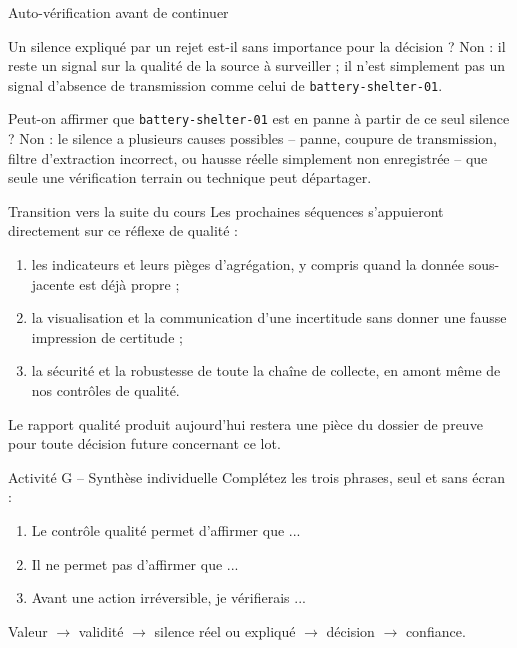 \documentclass[aspectratio=169]{beamer}
\begin{document}
\begin{frame}{Auto-vérification avant de continuer}
  \small
  \begin{block}{Un silence expliqué par un rejet est-il sans importance pour la décision ?}
    Non : il reste un signal sur la qualité de la source à surveiller ; il n'est simplement pas un signal d'absence de transmission comme celui de \texttt{battery-shelter-01}.
  \end{block}
  \begin{block}{Peut-on affirmer que \texttt{battery-shelter-01} est en panne à partir de ce seul silence ?}
    Non : le silence a plusieurs causes possibles -- panne, coupure de transmission, filtre d'extraction incorrect, ou hausse réelle simplement non enregistrée -- que seule une vérification terrain ou technique peut départager.
  \end{block}
\end{frame}

\begin{frame}{Transition vers la suite du cours}
  Les prochaines séquences s'appuieront directement sur ce réflexe de qualité :
  \begin{enumerate}
    \item les indicateurs et leurs pièges d'agrégation, y compris quand la donnée sous-jacente est déjà propre ;
    \item la visualisation et la communication d'une incertitude sans donner une fausse impression de certitude ;
    \item la sécurité et la robustesse de toute la chaîne de collecte, en amont même de nos contrôles de qualité.
  \end{enumerate}
  \vfill
  Le rapport qualité produit aujourd'hui restera une pièce du dossier de preuve pour toute décision future concernant ce lot.
\end{frame}

\begin{frame}{Activité G -- Synthèse individuelle}
  Complétez les trois phrases, seul et sans écran :
  \begin{enumerate}
    \item Le contrôle qualité permet d'affirmer que ...
    \item Il ne permet pas d'affirmer que ...
    \item Avant une action irréversible, je vérifierais ...
  \end{enumerate}
  \vfill
  \alert{Valeur $\rightarrow$ validité $\rightarrow$ silence réel ou expliqué $\rightarrow$ décision $\rightarrow$ confiance.}
\end{frame}
\end{document}
